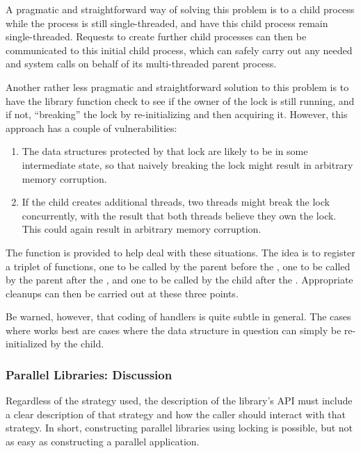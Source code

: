 A pragmatic and straightforward way of solving this problem is
to  a child process while the process is still single-threaded,
and have this child process remain single-threaded.
Requests to create further child processes can then be communicated
to this initial child process, which can safely carry out any
needed  and  system calls on behalf of its
multi-threaded parent process.

Another rather less pragmatic and straightforward solution to this problem
is to have the library function check to see if the owner of the lock
is still running, and if not, ``breaking'' the lock by re-initializing
and then acquiring it.
However, this approach has a couple of vulnerabilities:

\begin{enumerate}
\item	The data structures protected by that lock are likely to
	be in some intermediate state, so that naively breaking the lock
	might result in arbitrary memory corruption.
\item	If the child creates additional threads, two threads might
	break the lock concurrently, with the result that both
	threads believe they own the lock.
	This could again result in arbitrary memory corruption.
\end{enumerate}

The  function is provided to help deal with these situations.
The idea is to register a triplet of functions, one to be called by the
parent before the , one to be called by the parent after the
, and one to be called by the child after the .
Appropriate cleanups can then be carried out at these three points.

Be warned, however, that coding of  handlers is quite subtle
in general.
The cases where  works best are cases where the data structure
in question can simply be re-initialized by the child.

\subsubsection{Parallel Libraries: Discussion}
\label{sec:locking:Parallel Libraries: Discussion}

Regardless of the strategy used, the description of the library's API
must include a clear description of that strategy and how the caller
should interact with that strategy.
In short, constructing parallel libraries using locking is possible,
but not as easy as constructing a parallel application.

